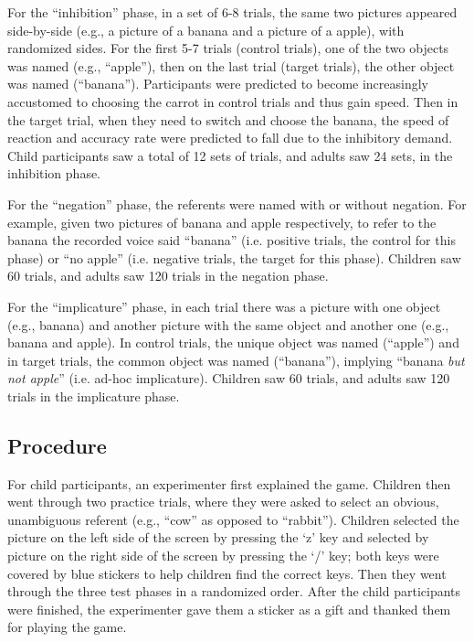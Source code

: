 \documentclass[10pt,letterpaper]{article}
\begin{document}
For the ``inhibition'' phase, in a set of 6-8 trials, the same two pictures appeared side-by-side (e.g., a picture of a banana and a picture of a apple), with randomized sides. For the first 5-7 trials (control trials), one of the two objects was named (e.g., ``apple''), then on the last trial  (target trials), the other object was named (``banana''). Participants were predicted to become increasingly accustomed to choosing the carrot in control trials and thus gain speed. Then in the target trial, when they need to switch and choose the banana, the speed of reaction and accuracy rate were predicted to fall due to the inhibitory demand. Child participants saw a total of 12 sets of trials, and adults saw 24 sets, in the inhibition phase.

For the ``negation'' phase, the referents were named with or without negation. For example, given two pictures of banana and apple respectively, to refer to the banana the recorded voice said ``banana'' (i.e. positive trials, the control for this phase) or ``no apple'' (i.e. negative trials, the target for this phase). Children saw 60 trials, and adults saw 120 trials in the negation phase. 

For the ``implicature'' phase, in each trial there was a picture with one object (e.g., banana) and another picture with the same object and another one (e.g., banana and apple). In control trials, the unique object was named (``apple'') and in target trials, the common object was named (``banana''), implying ``banana \emph{but not apple}'' (i.e. ad-hoc implicature). Children saw 60 trials, and adults saw 120 trials in the implicature phase.  

\subsection{Procedure}

For child participants, an experimenter first explained the game.  Children then went through two practice trials, where they were asked to select an obvious, unambiguous referent (e.g., ``cow'' as opposed to ``rabbit'').  Children selected the picture on the left side of the screen by pressing the `z' key and selected by picture on the right side of the screen by pressing the `/' key; both keys were covered by blue stickers to help children find the correct keys. Then they went through the three test phases in a randomized order.  After the child participants were finished, the experimenter gave them a sticker as a gift and thanked them for playing the game.
\end{document}
